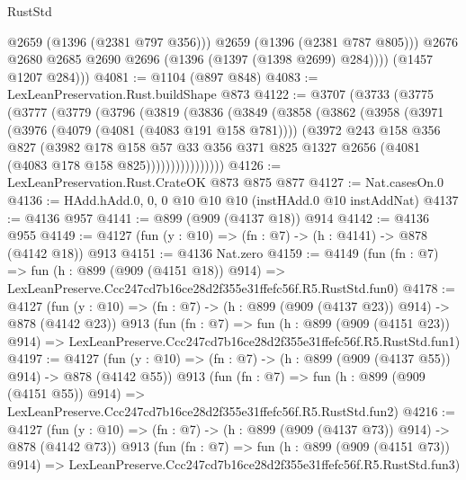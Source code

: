\begin{lexlean}{RustStd}
\begin{coremodule}
                @2659
                (@1396 (@2381 @797 @356)))
              @2659
              (@1396 (@2381 @787 @805)))
            @2676
            @2680
            @2685
            @2690
            @2696
            (@1396 (@1397 (@1398 @2699) @284))))
        (@1457 @1207 @284)))
@4081 := @1104 (@897 @848)
@4083 := LexLeanPreservation.Rust.buildShape @873
@4122 := @3707
    (@3733
      (@3775
        (@3777
          (@3779
            (@3796
              (@3819
                (@3836
                  (@3849
                    (@3858
                      (@3862
                        (@3958
                          (@3971
                            (@3976 (@4079 (@4081 (@4083 @191 @158 @781))))
                            (@3972
                              @243
                              @158
                              @356
                              @827
                              (@3982
                                @178
                                @158
                                @57
                                @33
                                @356
                                @371
                                @825
                                @1327
                                @2656
                                (@4081 (@4083 @178 @158 @825))))))))))))))))
@4126 := LexLeanPreservation.Rust.CrateOK @873 @875 @877
@4127 := Nat.casesOn.{0}
@4136 := HAdd.hAdd.{0, 0, 0} @10 @10 @10 (instHAdd.{0} @10 instAddNat)
@4137 := @4136 @957
@4141 := @899 (@909 (@4137 @18)) @914
@4142 := @4136 @955
@4149 := @4127 (fun (y : @10) => (fn : @7) -> (h : @4141) -> @878 (@4142 @18)) @913
@4151 := @4136 Nat.zero
@4159 := @4149
    (fun (fn : @7) =>
    fun (h : @899 (@909 (@4151 @18)) @914) =>
    LexLeanPreserve.Ccc247cd7b16ce28d2f355e31ffefc56f.R5.RustStd.fun0)
@4178 := @4127
    (fun (y : @10) => (fn : @7) -> (h : @899 (@909 (@4137 @23)) @914) -> @878 (@4142 @23))
    @913
    (fun (fn : @7) =>
    fun (h : @899 (@909 (@4151 @23)) @914) =>
    LexLeanPreserve.Ccc247cd7b16ce28d2f355e31ffefc56f.R5.RustStd.fun1)
@4197 := @4127
    (fun (y : @10) => (fn : @7) -> (h : @899 (@909 (@4137 @55)) @914) -> @878 (@4142 @55))
    @913
    (fun (fn : @7) =>
    fun (h : @899 (@909 (@4151 @55)) @914) =>
    LexLeanPreserve.Ccc247cd7b16ce28d2f355e31ffefc56f.R5.RustStd.fun2)
@4216 := @4127
    (fun (y : @10) => (fn : @7) -> (h : @899 (@909 (@4137 @73)) @914) -> @878 (@4142 @73))
    @913
    (fun (fn : @7) =>
    fun (h : @899 (@909 (@4151 @73)) @914) =>
    LexLeanPreserve.Ccc247cd7b16ce28d2f355e31ffefc56f.R5.RustStd.fun3)

\end{coremodule}
\end{lexlean}
